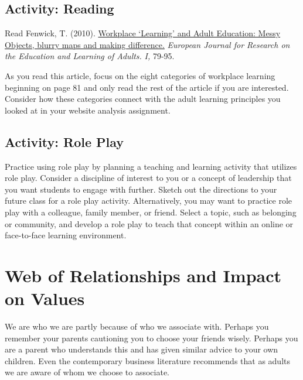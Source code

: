 \documentclass[
]{book}
\begin{document}
\hypertarget{activity-reading-1}{%
\subsection*{Activity: Reading}\label{activity-reading-1}}

\begin{reflect}
Read Fenwick, T. (2010). \href{assets/unit8/Fenwick_2010.pdf}{Workplace
`Learning' and Adult Education: Messy Objects, blurry maps and making
difference.} \emph{European Journal for Research on the Education and
Learning of Adults.} \emph{I,} 79-95.

As you read this article, focus on the eight categories of workplace
learning beginning on page 81 and only read the rest of the article if
you are interested. Consider how these categories connect with the adult
learning principles you looked at in your website analysis assignment.
\end{reflect}

\hypertarget{activity-role-play}{%
\subsection*{Activity: Role Play}\label{activity-role-play}}

\begin{reflect}
Practice using role play by planning a teaching and learning activity
that utilizes role play. Consider a discipline of interest to you or a
concept of leadership that you want students to engage with further.
Sketch out the directions to your future class for a role play activity.
Alternatively, you may want to practice role play with a colleague,
family member, or friend. Select a topic, such as belonging or
community, and develop a role play to teach that concept within an
online or face-to-face learning environment.
\end{reflect}

\hypertarget{web-of-relationships-and-impact-on-values}{%
\section{Web of Relationships and Impact on Values}\label{web-of-relationships-and-impact-on-values}}

We are who we are partly because of who we associate with. Perhaps you remember your parents cautioning you to choose your friends wisely. Perhaps you are a parent who understands this and has given similar advice to your own children. Even the contemporary business literature recommends that as adults we are aware of whom we choose to associate.
\end{document}
